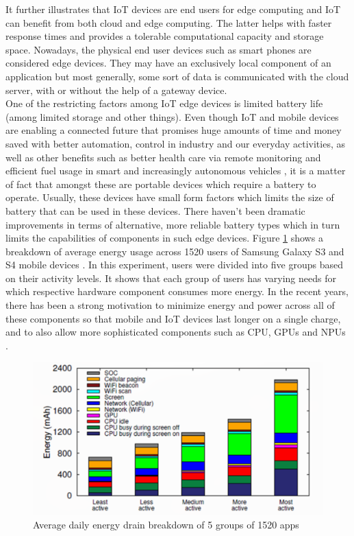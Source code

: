 It further illustrates that IoT devices are end users for edge computing and IoT can benefit from both 
cloud and edge computing. The latter helps with faster response times and provides a tolerable computational 
capacity and storage space. Nowadays, the physical end user devices such as smart phones are considered 
edge devices. They may have an exclusively local component of an application but most generally, some sort of 
data is communicated with the cloud server, with or without the help of a gateway device. \\
One of the restricting factors among IoT edge devices is limited battery life (among limited storage and other things). 
Even though IoT and mobile devices are enabling  a connected future that promises huge amounts of time and money 
saved with better automation, control in industry and our everyday activities, as well as other benefits such as 
better health care via remote monitoring and efficient fuel usage in smart and increasingly autonomous vehicles \cite{9017997}, 
it is a matter of fact that amongst these are portable devices which require a battery to operate. Usually, these 
devices have small form factors which limits the size of battery that can be used in these devices. There haven't 
been dramatic improvements in terms of alternative, more reliable battery types which in turn limits the 
capabilities of components in such edge devices. Figure \ref{fig:energyphone} shows a breakdown of average energy usage across 
1520 users of Samsung Galaxy S3 and S4 mobile devices \cite{9017997}. In this experiment, users were divided into 
five groups based on their activity levels. It shows that each group of users has varying needs for which respective 
hardware component consumes more energy. In the recent years, there has been a strong motivation to minimize energy 
and power across all of these components so that mobile and IoT devices last longer on a single charge, and to also 
allow more sophisticated components such as CPU, GPUs and NPUs \cite{9017997}. \\

\begin{figure}
    \begin{center}
        \includegraphics[scale=0.35]{Figs/energyphone.png}    
    \end{center}
    \caption{Average daily energy drain breakdown of 5 groups of 1520 apps \cite{9017997}}
    \label{fig:energyphone}
\end{figure}


